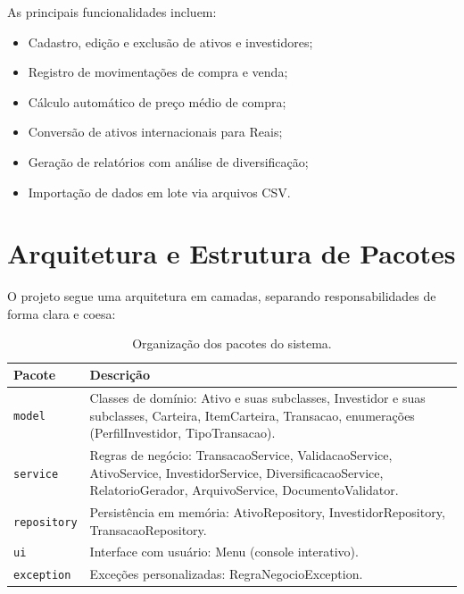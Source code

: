 \documentclass[11pt, a4paper]{article}
\begin{document}
As principais funcionalidades incluem:
\begin{itemize}[noitemsep]
    \item Cadastro, edição e exclusão de ativos e investidores;
    \item Registro de movimentações de compra e venda;
    \item Cálculo automático de preço médio de compra;
    \item Conversão de ativos internacionais para Reais;
    \item Geração de relatórios com análise de diversificação;
    \item Importação de dados em lote via arquivos CSV.
\end{itemize}

\section{Arquitetura e Estrutura de Pacotes}

O projeto segue uma arquitetura em camadas, separando responsabilidades de forma clara e coesa:

\begin{table}[H]
    \centering
    \begin{tabular}{@{}p{3.5cm}p{10.5cm}@{}}
        \toprule
        \textbf{Pacote} & \textbf{Descrição} \\ \midrule
        \texttt{model} & Classes de domínio: Ativo e suas subclasses, Investidor e suas subclasses, Carteira, ItemCarteira, Transacao, enumerações (PerfilInvestidor, TipoTransacao). \\ \midrule
        \texttt{service} & Regras de negócio: TransacaoService, ValidacaoService, AtivoService, InvestidorService, DiversificacaoService, RelatorioGerador, ArquivoService, DocumentoValidator. \\ \midrule
        \texttt{repository} & Persistência em memória: AtivoRepository, InvestidorRepository, TransacaoRepository. \\ \midrule
        \texttt{ui} & Interface com usuário: Menu (console interativo). \\ \midrule
        \texttt{exception} & Exceções personalizadas: RegraNegocioException. \\ \bottomrule
    \end{tabular}
    \caption{Organização dos pacotes do sistema.}
\end{table}
\end{document}
